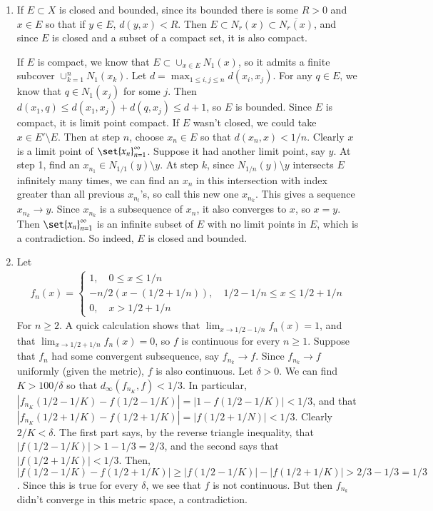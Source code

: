 \documentclass[12pt]{article}
\theoremstyle{definition}
\theoremstyle{remark}
\begin{document}
\begin{enumerate}[leftmargin=\labelsep]
		\item \fbox{$\implies$} 
		
		If $E \subset X$ is closed and bounded, since its bounded there is some $R > 0$ and $x \in E$ so that if $y \in E$, $d(y, x) < R$. Then $E \subset N_r(x) \subset \overline{N_r(x)}$, and since $E$ is closed and a subset of a compact set, it is also compact.
		
		\fbox{$\impliedby$}
		
		If $E$ is compact, we know that $E \subset \cup_{x \in E} N_1(x)$, so it admits a finite subcover $\cup_{k=1}^n N_1(x_k)$. Let $d = \max_{1 \leq i, j \leq n} d(x_i, x_j)$. For any $q \in E$, we know that $q \in N_1(x_j)$ for some $j$. Then $d(x_1, q) \leq d(x_1, x_j) + d(q, x_j) \leq d + 1$, so $E$ is bounded. Since $E$ is compact, it is limit point compact. If $E$ wasn't closed, we could take $x \in E' \setminus E$. Then at step $n$, choose $x_n \in E$ so that $d(x_n, x) < 1/n$. Clearly $x$ is a limit point of $\set{x_n}_{n=1}^\infty$. Suppose it had another limit point, say $y$. At step 1, find an $x_{n_1} \in N_{1/1}(y) \setminus y$. At step $k$, since $N_{1/n}(y) \setminus y$ intersects $E$ infinitely many times, we can find an $x_{n}$ in this intersection with index greater than all previous $x_{n_l}$'s, so call this new one $x_{n_k}$. This gives a sequence $x_{n_k} \to y$. Since $x_{n_k}$ is a subsequence of $x_n$, it also converges to $x$, so $x = y$. Then $\set{x_n}_{n=1}^\infty$ is an infinite subset of $E$ with no limit points in $E$, which is a contradiction. So indeed, $E$ is closed and bounded.
		
		\item Let \begin{align*}
			f_n(x) = \begin{cases}
			1, \quad 0 \leq x \leq 1/n \\
			-n/2(x-(1/2+1/n)), \quad 1/2-1/n \leq x \leq 1/2+1/n \\
			0, \quad x > 1/2 + 1/n
			\end{cases}
		\end{align*} For $n \geq 2$. A quick calculation shows that $\lim_{x \to 1/2 - 1/n} f_n(x) = 1$, and that $\lim_{x \to 1/2+1/n} f_n(x) = 0$, so $f$ is continuous for every $n \geq 1$. Suppose that $f_n$ had some convergent subsequence, say $f_{n_k} \to f$. Since $f_{n_k} \to f$ uniformly (given the metric), $f$ is also continuous. Let $\delta > 0$. We can find $K > 100/\delta$ so that $d_\infty(f_{n_K}, f) < 1/3$. In particular, $|f_{n_K}(1/2-1/K) - f(1/2-1/K)| = |1 - f(1/2-1/K)| < 1/3$, and that $|f_{n_K}(1/2+1/K)-f(1/2+1/K)| = |f(1/2+1/N)|< 1/3$. Clearly $2/K < \delta$. The first part says, by the reverse triangle inequality, that $|f(1/2-1/K)| > 1 - 1/3 = 2/3$, and the second says that $|f(1/2+1/K)| < 1/3$. Then, $|f(1/2-1/K)-f(1/2+1/K)| \geq |f(1/2-1/K)| - |f(1/2+1/K)| > 2/3 - 1/3 = 1/3$. Since this is true for every $\delta$, we see that $f$ is not continuous. But then $f_{n_k}$ didn't converge in this metric space, a contradiction.
		
	\end{enumerate}
\end{document}
